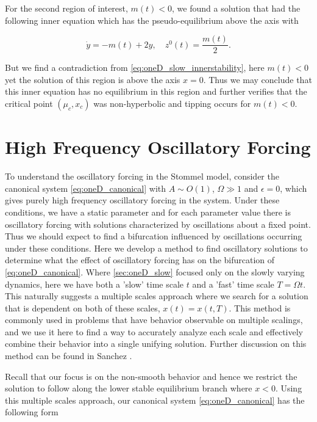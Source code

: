 For the second region of interest, $m(t)<0$, we found a solution that had the following inner equation which has the pseudo-equilibrium above the axis with

\begin{equation}\label{eq:oneD_slow_innerstability}
\dot{y}=-m(t)+2y, \quad z^0(t) = \frac{m(t)}{2}.
\end{equation}

But we find a contradiction from \eqref{eq:oneD_slow_innerstability}, here $m(t)<0$ yet the solution of this region is above the axis $x=0$. Thus we may conclude that this inner equation has no equilibrium in this region and further verifies that the critical point $(\mu_c,x_c)$ was non-hyperbolic and tipping occurs for $m(t)<0$.

\section{High Frequency Oscillatory Forcing}
\label{sec:oneD_highfreqosc}

To understand the oscillatory forcing in the Stommel model, consider the canonical system \eqref{eq:oneD_canonical} with $A\sim O(1)$, $\Omega\gg 1$ and $\epsilon=0$, which gives purely high frequency oscillatory forcing in the system. Under these conditions, we have a static parameter and for each parameter value there is oscillatory forcing with solutions characterized by oscillations about a fixed point. Thus we should expect to find a bifurcation influenced by oscillations occurring under these conditions. Here we develop a method to find oscillatory solutions to determine what the effect of oscillatory forcing has on the bifurcation of \eqref{eq:oneD_canonical}. Where \autoref{sec:oneD_slow} focused only on the slowly varying dynamics, here we have both a 'slow' time scale $t$ and a 'fast' time scale $T=\Omega t$. This naturally suggests a multiple scales approach where we search for a solution that is dependent on both of these scales, $x(t)=x(t,T)$. This method is commonly used in problems that have behavior observable on multiple scalings, and we use it here to find a way to accurately analyze each scale and effectively combine their behavior into a single unifying solution. Further discussion on this method can be found in Sanchez \cite{sanchez1996method}.

Recall that our focus is on the non-smooth behavior and hence we restrict the solution to follow along the lower stable equilibrium branch where $x<0$. Using this multiple scales approach, our canonical system \eqref{eq:oneD_canonical} has the following form

